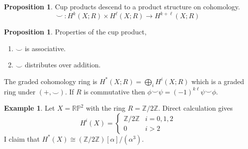 \documentclass[12pt]{extarticle}
\newcommand{\Z}{\mathbb{Z}}
\newcommand{\rp}{\mathbb{RP}}
\theoremstyle{definition}
\newtheorem{proposition}[theorem]{Proposition}
\newtheorem{example}[theorem]{Example}
\newenvironment{definition}[1][Definition:]{\begin{trivlist}
\item[\hskip \labelsep {\bfseries #1}]}{\end{trivlist}}
\begin{document}
\begin{proposition}
Cup products descend to a product structure on cohomology.
\[\smile \: : H^k(X ; R) \times H^{\ell}(X ; R) \to H^{k + \ell}(X ; R) \]
\end{proposition}

\begin{proposition}
Properties of the cup product,
\begin{enumerate}
\item $\smile$ is associative.
\item $\smile$ distributes over addition.
\end{enumerate}
\end{proposition}

\begin{definition}
The graded cohomology ring is $H^{\ast}(X ; R) = \bigoplus\limits_{i} H^i(X ; R)$ which is a graded ring under $(+, \smile)$. If $R$ is commutative then $\phi \smile \psi = (-1)^{k \ell} \psi \smile \phi$. 
\end{definition}

\begin{example}
Let $X = \rp^2$ with the ring $R = \Z / 2 \Z$. Direct calculation gives \[ H^i(X) = 
\begin{cases}
\Z / 2 \Z & i = 0, 1, 2
\\
0 & i > 2
\end{cases}\]
I claim that $H^{\ast}(X) \cong (\Z / 2 \Z) [\alpha] / (\alpha^3)$.
\end{example}
\end{document}
